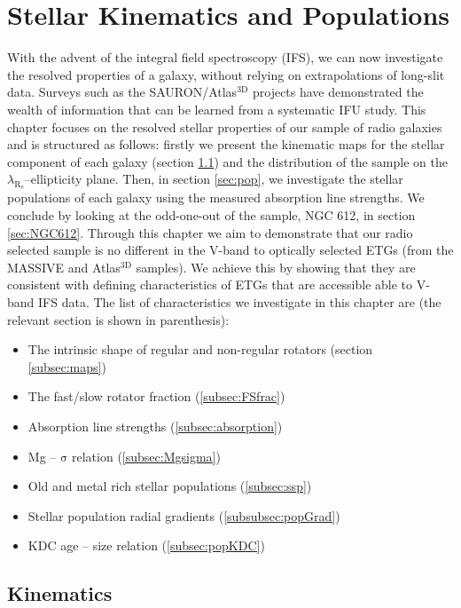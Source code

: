 \chapter{Stellar Kinematics and Populations}
	\label{cha:stellar}
With the advent of the integral field spectroscopy (IFS), we can now investigate the resolved properties of a galaxy, without relying on extrapolations of long-slit data. Surveys such as the SAURON/Atlas$^\text{3D}$ projects have demonstrated the wealth of information that can be learned from a systematic IFU study. This chapter focuses on the resolved stellar properties of our sample of radio galaxies and is structured as follows: firstly we present the kinematic maps for the stellar component of each galaxy (section \ref{sec:stellarKin}) and the distribution of the sample on the $\lambda_\mathrm{R_e}$--ellipticity plane. Then, in section \ref{sec:pop}, we investigate the stellar populations of each galaxy using the measured absorption line strengths. We conclude by looking at the odd-one-out of the sample, NGC 612, in section \ref{sec:NGC612}. Through this chapter we aim to demonstrate that our radio selected sample is no different in the V-band to optically selected ETGs (from the MASSIVE and Atlas$^\text{3D}$ samples). We achieve this by showing that they are consistent with defining characteristics of ETGs that are accessible able to V-band IFS data. The list of characteristics we investigate in this chapter are (the relevant section is shown in parenthesis):
\begin{itemize}
	\item The intrinsic shape of regular and non-regular rotators (section \ref{subsec:maps})
	\item The fast/slow rotator fraction (\ref{subsec:FSfrac})
	\item Absorption line strengths (\ref{subsec:absorption})
	\item Mg -- $\mathrm{\sigma}$ relation (\ref{subsec:Mgsigma})
	\item Old and metal rich stellar populations (\ref{subsec:ssp})
	\item Stellar population radial gradients (\ref{subsubsec:popGrad})
	\item KDC age -- size relation (\ref{subsec:popKDC})
\end{itemize}

\section{Kinematics}
	\label{sec:stellarKin}

